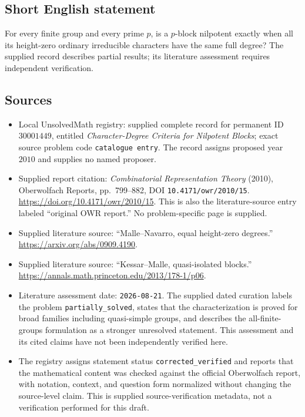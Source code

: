 \documentclass[11pt]{article}
\begin{document}
\subsection{Short English statement}
For every finite group and every prime \(p\), is a \(p\)-block nilpotent exactly when all its height-zero ordinary irreducible characters have the same full degree? The supplied record describes partial results; its literature assessment requires independent verification.
\subsection{Sources}
\begin{itemize}
\item Local UnsolvedMath registry: supplied complete record for permanent ID \(30001449\), entitled \emph{Character-Degree Criteria for Nilpotent Blocks}; exact source problem code \texttt{catalogue entry}. The record assigns proposed year \(2010\) and supplies no named proposer.
\item Supplied report citation: \emph{Combinatorial Representation Theory} (2010), Oberwolfach Reports, pp.~799--882, DOI \texttt{10.4171/owr/2010/15}. \url{https://doi.org/10.4171/owr/2010/15}. This is also the literature-source entry labeled ``original OWR report.'' No problem-specific page is supplied.
\item Supplied literature source: ``Malle--Navarro, equal height-zero degrees.'' \url{https://arxiv.org/abs/0909.4190}.
\item Supplied literature source: ``Kessar--Malle, quasi-isolated blocks.'' \url{https://annals.math.princeton.edu/2013/178-1/p06}.
\item Literature assessment date: \texttt{2026-08-21}. The supplied dated curation labels the problem \texttt{partially\_solved}, states that the characterization is proved for broad families including quasi-simple groups, and describes the all-finite-groups formulation as a stronger unresolved statement. This assessment and its cited claims have not been independently verified here.
\item The registry assigns statement status \texttt{corrected\_verified} and reports that the mathematical content was checked against the official Oberwolfach report, with notation, context, and question form normalized without changing the source-level claim. This is supplied source-verification metadata, not a verification performed for this draft.
\end{itemize}
\end{document}
